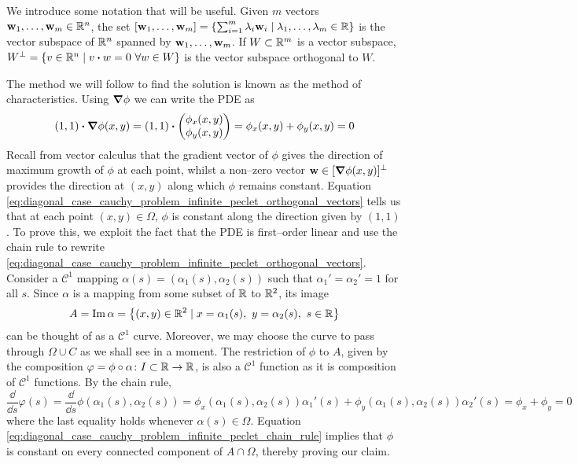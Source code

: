 We introduce some notation that will be useful. Given $m$ vectors $\vb{w}_1,
\ldots, \vb{w}_m \in \mathbb{R}^n$, the set $[\vb{w}_1, \ldots, \vb{w}_m] = \{
\sum_{i=1}^m \lambda_i \vb{w}_i \mid \lambda_1, \ldots, \lambda_m \in \mathbb{R} \}$
is the vector subspace of $\mathbb{R}^n$ spanned by $\vb{w}_1, \ldots, \vb{w}_m$. If
$W \subset \mathbb{R}^m$ is a vector subspace, $W^\perp = \{ v \in \real^n \mid v
\vdot w = 0 \ \forall w \in W \}$ is the vector subspace orthogonal to $W$.

The method we will follow to find the solution is known as the method of
characteristics. Using $\grad{\phi}$ we can write the PDE as
\begin{equation} \label{eq:diagonal_case_cauchy_problem_infinite_peclet_orthogonal_vectors}
	\left( 1, 1 \right)
	\vdot
	\grad{\phi}(x,y) = 
	\left( 1, 1 \right)
	\vdot
	\begin{pmatrix}
		\phi_x(x,y) \\ \phi_y(x,y)
	\end{pmatrix} = 
	\phi_x(x,y) + \phi_y(x,y) = 0
\end{equation}
Recall from vector calculus that the gradient vector of $\phi$ gives the
direction of maximum growth of $\phi$ at each point, whilst a non--zero vector
$\vb{w} \in [\grad{\phi}(x,y)]^\perp$ provides the direction at $(x,y)$ along
which $\phi$ remains constant. Equation
\eqref{eq:diagonal_case_cauchy_problem_infinite_peclet_orthogonal_vectors} tells
us that at each point $(x,y) \in \Omega$, $\phi$ is constant along the direction
given by $(1, 1)$. To prove this, we exploit the fact that the PDE is
first--order linear and use the chain rule to rewrite
\eqref{eq:diagonal_case_cauchy_problem_infinite_peclet_orthogonal_vectors}.
Consider a $\mathcal{C}^1$ mapping $\alpha(s) = (\alpha_1(s), \alpha_2(s))$ such
that $\alpha_1' = \alpha_2' = 1$ for all $s$. Since $\alpha$ is a mapping from
some subset of $\mathbb{R}$ to $\mathbb{R}^2$, its image
\begin{equation*}
	A = 
	\image \alpha = 
	\left\{ (x,y) \in \real^2 \mid x = \alpha_1(s), \ y = \alpha_2(s), \ s \in \real \right\}
\end{equation*}
can be thought of as a $\mathcal{C}^1$ curve. Moreover, we may choose the curve to
pass through $\Omega \cup C$ as we shall see in a moment. The restriction of $\phi$
to $A$, given by the composition $\varphi = \phi \circ \alpha \colon I \subset
\mathbb{R} \rightarrow \mathbb{R}$, is also a $\mathcal{C}^1$ function as it is
composition of $\mathcal{C}^1$ functions. By the chain rule,
\begin{equation} \label{eq:diagonal_case_cauchy_problem_infinite_peclet_chain_rule}
	\frac{\dd}{\dd{s}} \varphi(s) = 
	\frac{\dd}{\dd{s}} \phi(\alpha_1(s), \alpha_2(s)) = 
	\phi_x (\alpha_1(s), \alpha_2(s)) \alpha_1'(s) +  	
	\phi_y (\alpha_1(s), \alpha_2(s)) \alpha_2'(s) =
	\phi_x + \phi_y = 0
\end{equation}
where the last equality holds whenever $\alpha(s) \in \Omega$. Equation
\eqref{eq:diagonal_case_cauchy_problem_infinite_peclet_chain_rule} implies that
$\phi$ is constant on every connected component of $A \cap
\Omega$, thereby proving our claim. 

